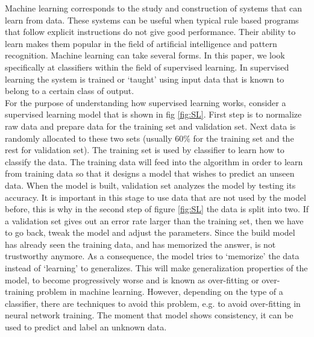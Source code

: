 Machine learning corresponds to the study and construction of systems that can learn from data. These systems can be useful when typical rule based programs that follow explicit instructions do not give good performance. Their ability to learn makes them popular in the field of artificial intelligence and pattern recognition. Machine learning can take several forms. In this paper, we look specifically at classifiers within the field of supervised learning. In supervised learning the system is trained or `taught' using input data that is known to belong to a certain class of output.\\ 

For the purpose of understanding how supervised learning works, consider a supervised learning model that is shown in fig \ref{fig:SL}. First step is to normalize raw data and prepare data for the training set and validation set. Next data is randomly allocated to these two sets (usually 60\% for the training set and the rest for validation set). The training set is used by classifier to learn how to classify the data. The training data will feed into the algorithm in order to learn from training data so that it designs a model that wishes to predict an unseen data. When the model is built, validation set analyzes the model by testing its accuracy. It is important in this stage to use data that are not used by the model before, this is why in the second step of figure \ref{fig:SL} the data is split into two.  If a validation set gives out an error rate larger than the training set, then we have to go back, tweak the model and adjust the parameters. Since the build model has already seen the training data, and has memorized the answer, is not trustworthy anymore. As a consequence, the model tries to `memorize' the data instead of `learning' to generalizes. This will make generalization properties of the model, to become progressively worse and is known as over-fitting or over-training\cite{wiki:of} problem in machine learning. However, depending on the type of a classifier, there are techniques to avoid this problem, e.g. to avoid over-fitting in neural network training\cite{Piotrowski201397}. The moment that model shows consistency, it can be used to predict and label an unknown data. \\  
 
